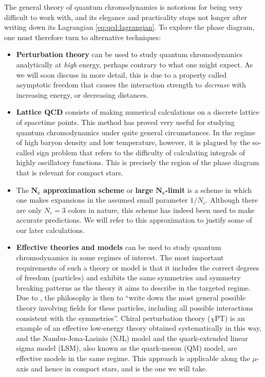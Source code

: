 The general theory of quantum chromodynamics is notorious for being very difficult to work with,
and its elegance and practicality stops not longer after writing down its Lagrangian \eqref{eq:qcd:lagrangian}.
To explore the phase diagram, one must therefore turn to alternative techniques:
\begin{itemize}
\item \textbf{Perturbation theory} can be used to study quantum chromodynamics analytically at \emph{high} energy, perhaps contrary to what one might expect.
      As we will soon discuss in more detail, this is due to a property called asymptotic freedom that causes the interaction strength to \emph{decrease} with increasing energy, or decreasing distances.
\item \textbf{Lattice QCD} consists of making numerical calculations on a discrete lattice of spacetime points.
      This method has proved very useful for studying quantum chromodynamics under quite general circumstances.
      In the regime of high baryon density and low temperature, however, it is plagued by the so-called sign problem that refers to the difficulty of calculating integrals of highly oscillatory functions.
      This is precisely the region of the phase diagram that is relevant for compact stars.
\item The \textbf{$\bm{N_c}$ approximation scheme} or \textbf{large $\bm{N_c}$-limit} is a scheme in which one makes expansions in the assumed small parameter $1/N_c$.
      Although there are only $N_c = 3$ colors in nature, this scheme has indeed been used to make accurate predictions.
      We will refer to this approximation to justify some of our later calculations.
\item \textbf{Effective theories and models} can be used to study quantum chromodynamics in some regimes of interest.
      The most important requirements of such a theory or model is that it includes the correct degrees of freedom (particles) and exhibits the same symmetries and symmetry breaking patterns as the theory it aims to describe in the targeted regime.
      Due to \cite{ref:weinberg_eft}, the philosophy is then to ``write down the most general possible theory involving fields for these particles, including all possible interactions consistent with the symmetries''.
      Chiral perturbation theory ($\chi$PT) is an example of an effective low-energy theory obtained systematically in this way,
      and the Nambu-Jona-Lasinio (NJL) model and the quark-extended linear sigma model (LSM), also known as the quark-meson (QM) model, are effective models in the same regime.
      This approach is applicable along the $\mu$-axis and hence in compact stars, and is the one we will take.
\end{itemize}

